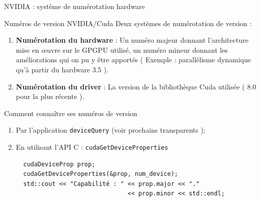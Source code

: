 \documentclass[handout,francais]{beamer}
\begin{document}
\begin{frame}[fragile]{NVIDIA : système de numérotation hardware}
\scriptsize
 \begin{block}{Numéros de version NVIDIA/Cuda}
 Deux systèmes de numérotation de version :
 \begin{enumerate}
 \item \textbf{Numérotation du hardware} : Un numéro majeur donnant l'architecture mise en {\oe}uvre sur le GPGPU utilisé, un numéro
 mineur donnant les améliorations qui on pu y être apportés ( Exemple : parallélisme dynamique qu'à partir du hardware 3.5 ). 
 \item \textbf{Numérotation du driver} : La version de la bibliothèque Cuda utilisée ( 8.0 pour la plus récente ).
 \end{enumerate}
 \end{block}
 
 \begin{block}{Comment connaître ses numéros de version}
 \begin{enumerate}
  \item Par l'application \texttt{deviceQuery} (voir prochains transparents );
  \item En utilisant l'API C : \texttt{cudaGetDeviceProperties}
  \begin{lstlisting}
  cudaDeviceProp prop;
  cudaGetDeviceProperties(&prop, num_device);
  std::cout << "Capabilité : " << prop.major << "." 
                               << prop.minor << std::endl;
  \end{lstlisting}
 \end{enumerate}
 \end{block}
\end{frame}
\end{document}
